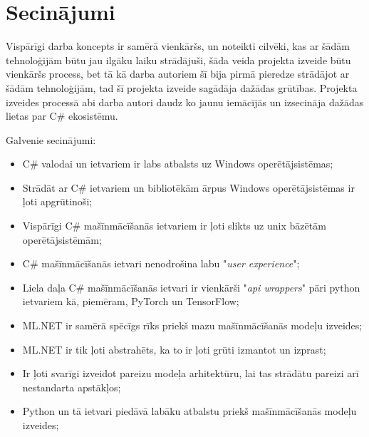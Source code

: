 \section{Secinājumi}

    Vispārīgi darba koncepts ir samērā vienkāršs, un noteikti cilvēki, kas ar šādām tehnoloģijām būtu jau
    ilgāku laiku strādājuši, šāda veida projekta izveide būtu vienkāršs process, bet tā kā darba autoriem
    šī bija pirmā pieredze strādājot ar šādām tehnoloģijām, tad šī projekta izveide sagādāja dažādas
    grūtības. Projekta izveides processā abi darba autori daudz ko jaunu iemācījās un izsecināja
    dažādas lietas par C\# ekosistēmu.

    Galvenie secinājumi:
    \begin{itemize}
        \item C\# valodai un ietvariem ir labs atbalsts uz Windows operētājsistēmas;
        \item Strādāt ar C\# ietvariem un bibliotēkām ārpus Windows operētājsistēmas ir ļoti apgrūtinoši;
        \item Vispārīgi C\# mašīnmācīšanās ietvariem ir ļoti slikts uz unix bāzētām operētājsistēmām;
        \item C\# mašīnmācīšanās ietvari nenodrošina labu "\textit{user experience}";
        \item Liela daļa C\# mašīnmācīšanās ietvari ir vienkārši "\textit{api wrappers}" pāri python ietvariem kā, piemēram, PyTorch un TensorFlow;
        \item ML.NET ir samērā spēcīgs rīks priekš mazu mašīnmācīšanās modeļu izveides;
        \item ML.NET ir tik ļoti abstrahēts, ka to ir ļoti grūti izmantot un izprast;
        \item Ir ļoti svarīgi izveidot pareizu modeļa arhitektūru, lai tas strādātu pareizi arī nestandarta apstākļos;
        \item Python un tā ietvari piedāvā labāku atbalstu priekš mašīnmācīšanās modeļu izveides;
    \end{itemize}
